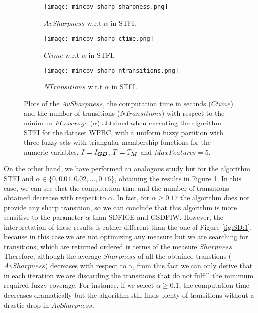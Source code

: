   \begin{figure}[H]
 	\centering
 	\begin{subfigure}{.4\textwidth}
 		\centering
 		\texttt{[image: mincov\_sharp\_sharpness.png]}
 		\caption{$AvSharpness$ w.r.t $\alpha$ in STFI.}
 	\end{subfigure}\hspace{0.5cm}
 	\begin{subfigure}{.4\textwidth}
 		\centering
 		\texttt{[image: mincov\_sharp\_ctime.png]}
 		\caption{$Ctime$ w.r.t $\alpha$ in STFI.}
 	\end{subfigure}
 	\begin{subfigure}{.4\textwidth}
 		\centering
 		\texttt{[image: mincov\_sharp\_ntransitions.png]}
 		\caption{$NTransitions$ w.r.t $\alpha$ in STFI.}
 	\end{subfigure}
 	\caption{Plots of the $AvSharpness$, the computation time in seconds ($Ctime$) and the number of transitions ($NTransitions$) with respect to the minimum $FCoverage$ ($\alpha$) obtained when executing the algorithm STFI for the dataset WPBC, with a uniform fuzzy partition with three fuzzy sets with triangular membership functions for the numeric variables, $I=I_{\bm{GD}}$, $T=T_{\bm{M}}$ and $MaxFeatures =5$.}
 	\label{fig:SD:2}
 \end{figure}
 
 On the other hand, we have performed an analogous study but for the algorithm STFI and $\alpha \in \{0,0.01,0.02,\dots,0.16\}$, obtaining the results in Figure \ref{fig:SD:2}. In this case, we can see that the computation time and the number of transitions obtained decrease with respect to $\alpha$. In fact, for $\alpha \geq 0.17$ the algorithm does not provide any sharp transition, so we can conclude that this algorithm is more sensitive to the parameter $\alpha$ than SDFIOE and GSDFIW. However, the interpretation of these results is rather different than the one of Figure \ref{fig:SD:1}, because in this case we are not optimizing any measure but we are searching for transitions, which are returned ordered in terms of the measure $Sharpness$. Therefore, although the average $Sharpness$ of all the obtained transtions ($AvSharpness$) decreases with respect to $\alpha$, from this fact we can only derive that in each iteration we are discarding the transitions that do not fulfill the minimum required fuzzy coverage. For instance, if we select $\alpha \geq 0.1$, the computation time decreases dramatically but the algorithm still finds plenty of transitions without a drastic drop in $AvSharpness$.
 
